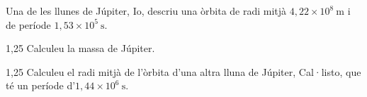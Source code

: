 Una de les llunes de Júpiter, Io, descriu una òrbita de radi mitjà $4,22\times 10^{8}\ \mathrm{m}$ i de període $1,53\times 10^{5}\ \mathrm{s}$.

\begin{apartat}{1,25}
Calculeu la massa de Júpiter.
\end{apartat}

\begin{apartat}{1,25}
Calculeu el radi mitjà de l'òrbita d'una altra lluna de Júpiter, Cal·listo, que té un període d'$1,44\times 10^{6}\ \mathrm{s}$.
\end{apartat}

